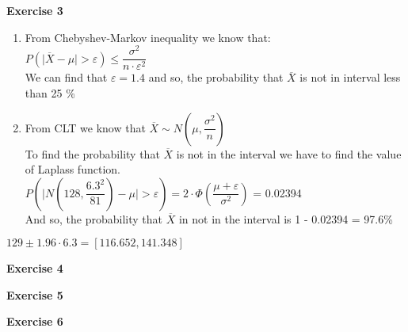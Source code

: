 \documentclass[12pt]{article}
\begin{document}
\textbf{Exercise 3}

\begin{list}{()~}{}
\item
\begin{enumerate}
\item
From Chebyshev-Markov inequality we know that:\\
$P\left( \vert \overline{X} - \mu \vert > \varepsilon \right) \leq \dfrac{\sigma^2}{n \cdot \varepsilon^2}$\\
We can find that $\varepsilon = 1.4$ and so, the probability that $\overline{X}$ is not in interval less than 25 \%
\item
From CLT we know that $\overline{X} \sim N\left( \mu, \dfrac{\sigma^2}{n} \right)$\\
To find the probability that $\overline{X}$ is not in the interval we have to find the value of Laplass function.\\
$P\left( \vert N(128, \dfrac{6.3^2}{81}) - \mu   \vert > \varepsilon \right) = 2 \cdot \Phi\left(\dfrac{\mu + \varepsilon}{\sigma^2}\right)$ = 0.02394\\
And so, the probability that $\overline{X}$ in not in the interval is 1 - 0.02394 = 97.6\%
\end{enumerate}
\item
$129 \pm 1.96 \cdot 6.3 = [116.652, 141.348] $
\end{list}
\medskip

\medskip		

\textbf{Exercise 4}

\begin{list}{()~}{}
\item
\item
\item
\end{list}
\medskip

\textbf{Exercise 5}

\begin{list}{()~}{}
\item
\item
\item
\end{list}

\medskip

\textbf{Exercise 6}

\begin{list}{()~}{}
\item
\item
\item
\end{list}
\end{document}
